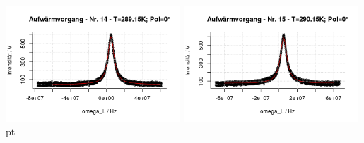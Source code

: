 \documentclass[12pt]{article}
\begin{document}
\begin{minipage}[h!]{\textwidth}
{	\includegraphics[width=0.49\textwidth]{figures/warm0-14.png}\vskip -10pt}	\includegraphics[width=0.49\textwidth]{figures/warm0-15.png} pt
\end{minipage}\newpage
\end{document}
